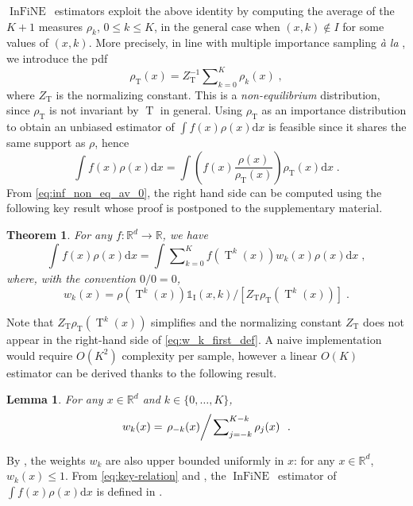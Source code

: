 \documentclass{article}
\newtheorem{theorem}{Theorem}
\newtheorem{lemma}[lemma]{Lemma}
\def\IFIS{\ensuremath{\operatorname{InFiNE}}}
\def\transfo{\operatorname{T}}
\def\rmd{\operatorname{d}\hspace{-2pt}}
\def\rset{\mathbb{R}}
\def\dummy{f}
\def\rmd{\mathrm{d}}
\def\eqsp{\,}
\def\eqsp{\;}
\newcommand{\1}{\mathds{1}}
\newcommand{\indi}[1]{\1_{#1}}
\def\rmi{\mathrm{I}}
\def\const{Z}
\def\rset{\mathbb{R}}
\def\rmd{\mathrm{d}}
\def\rhoT{\rho_{\transfo}}
\def\constT{\const_{\transfo}}
\begin{document}
\IFIS\ estimators exploit the above identity by computing the average of the $K+1$ measures $\rho_k$, $0\leq k \leq K$, in the general case when $(x,k) \notin I$ for some values of $(x,k)$. More precisely, in line with multiple importance sampling \emph{\`a la} \cite{owen:zhou:2000}, we introduce the pdf
\begin{equation}\label{eq:rhoT}
    \rhoT(x) =  \constT^{-1}\sum\nolimits_{k = 0}^K \rho_k(x)\eqsp, 
  \end{equation}
where $\constT$ is the normalizing constant.
This is a \textit{non-equilibrium} distribution, since $\rhoT$ is not invariant by $\transfo$ in general.
Using $\rhoT$ as an importance distribution to obtain an unbiased
  estimator of $\int \dummy(x) \rho(x) \rmd x$ is feasible since it shares the same support as $\rho$, hence
\[
\int \dummy(x) \rho(x)  \rmd x =\int \left(\dummy(x) \frac{\rho(x)}{\rhoT(x)}\right) \rhoT(x)  \rmd x\eqsp.
\]
From \eqref{eq:inf_non_eq_av_0}, the right hand side can be computed using the following key result whose proof is postponed to the supplementary material.
\begin{theorem}
 \label{theo:inf_non_eq}
 For any $f:\rset^d \to \rset$, we have
\begin{equation}
\label{eq:key-relation}
\int_{} \dummy(x) \rho(x)  \rmd x =
\int_{} \sum\nolimits_{k=0}^K  \dummy(\transfo^{k}(x)) w_k(x) \rho(x)  \rmd x \eqsp,
\end{equation}
where, with the convention $0/0=0$,
\begin{equation}
\label{eq:w_k_first_def}
w_k(x)=\rho(\transfo^{k}(x))\indi{\rmi}(x,k) / [\constT\rhoT(\transfo^{k}(x))]  \eqsp.
\end{equation}
\end{theorem}
Note that $\constT\rhoT(\transfo^{k}(x))$ simplifies and the
normalizing constant $\constT$ does not appear in the right-hand
side of \eqref{eq:w_k_first_def}. A naive implementation would require $O(K^2)$ complexity per sample, however a linear $O(K)$ estimator can be derived thanks to the following result.
\begin{lemma}
\label{SPlemma:weights}
For any $x \in \rset^d$ and $k \in\{0, \dots, K\}$,
\begin{equation}
  \label{eq:def_w_k}
    w_{k}(x) =  \left.  \rho_{-k}(x) \middle / \left. \sum\nolimits_{j=-k}^{K-k} \rho_{j}(x) \right. \right. \eqsp.
\end{equation}
\end{lemma}
By , the weights $w_{k}$ are also upper bounded uniformly in $x$: for any $x \in \rset^d$,  $w_{k}(x) \leq 1$. From \eqref{eq:key-relation} and , the \IFIS\ estimator of $\int f(x) \rho(x) \rmd x$ is defined in .
\end{document}

